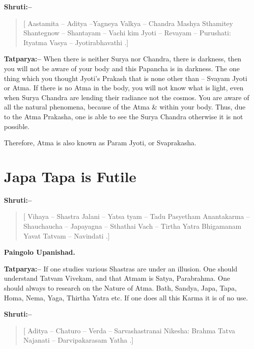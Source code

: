 \textbf{Shruti:–}

\begin{verse}
[ Aastamita – Aditya –Yagneya Valkya – Chandra Mashya Sthamitey Shantegnow – Shantayam – Vachi  kim Jyoti – Revayam – Purushati:  Ityatma Vasya – Jyotirabhavathi .]
\end{verse}

\textbf{Tatparya:–} When there is neither Surya nor Chandra, there is darkness, then you will not be aware of your body and this Papancha is in darkness. The one thing which you thought Jyoti's Prakash that is none other than – Svayam Jyoti or Atma. If there is no Atma in the body, you will not know what is light, even when Surya Chandra are lending their radiance not the cosmos. You are aware of all the natural phenomena, because of the Atma \& within your body. Thus, due to the Atma Prakasha, one is able to see the Surya Chandra otherwise it is not possible.

Therefore, Atma is also known as Param Jyoti, or Svaprakasha.

\chapter{Japa Tapa is Futile}

\textbf{Shruti:–}

\begin{verse}
[ Vihaya – Shastra Jalani – Yatsa tyam – Tadu Pasyetham  Anantakarma – Shauchaucha – Japayagna – Sthathai Vach – Tirtha Yatra Bhigamanam Yavat Tatvam – Navindati .]
\end{verse}

\begin{flushright}
\textbf{Paingolo Upanishad.}
\end{flushright}

\textbf{Tatparya:–} If one studies various Shastras are under an illusion. One should understand Tatvam Vivekam, and that Atmam is Satya, Parabrahma. One should always to research on the Nature of Atma. Bath, Sandya, Japa, Tapa, Homa, Nema, Yaga, Thirtha Yatra etc. If one does all this Karma it is of no use.

\textbf{Shruti:–}

\begin{verse}
[ Aditya – Chaturo – Verda – Sarvashastranai Nikesha:  Brahma Tatva Najanati – Darvipakarasam Yatha .]
\end{verse}

